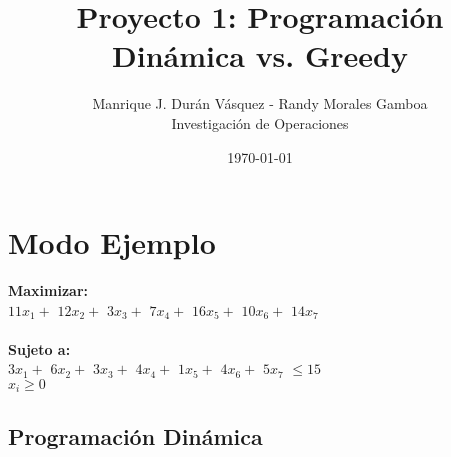 \documentclass[12pt]{article}
\title{Proyecto 1: Programaci\'on Din\'amica vs. Greedy}
\author{Manrique J. Dur\'an V\'asquez - Randy Morales Gamboa\\Investigaci\'on de Operaciones\\}
\date{\today}
\newcommand\tab[1][1cm]{\hspace*{#1}}
\begin{document}
\maketitle
\pagebreak

\section*{Modo Ejemplo}

\textbf{Maximizar:} \\
\tab$11x_{1} + $ $12x_{2} + $ $3x_{3} + $ $7x_{4} + $ $16x_{5} + $ $10x_{6} + $ $14x_{7}   $ \\\\
\textbf{Sujeto a:}\\
\tab$3x_{1} + $ $6x_{2} + $ $3x_{3} + $ $4x_{4} + $ $1x_{5} + $ $4x_{6} + $ $5x_{7}   $ $\leq 15$\\
\tab$x_i \geq 0$\subsection*{Programaci\'on Din\'amica}
\end{document}
